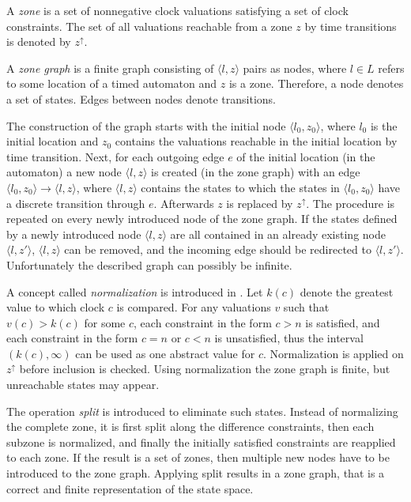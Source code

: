 A \emph{zone} is a set of nonnegative clock valuations satisfying a set of clock constraints.
The set of all valuations reachable from a zone $z$ by time transitions is denoted by $z^\uparrow$.

A \emph{zone graph} is a finite graph consisting of $\langle l,z \rangle$ pairs as nodes, where $l \in L$ refers to some
location of a timed automaton and $z$ is a zone. Therefore, a node denotes a set
of states. Edges between nodes denote transitions. 

The construction of the graph starts with the initial node  $\langle l_0,z_0 \rangle$,
where $l_0$ is the initial location and $z_0$ contains the valuations reachable in the initial location by time transition. 
Next, for each outgoing edge $e$ of the initial location (in the automaton) a new node  $\langle l,z \rangle$ is created (in the zone graph) with an edge
$\langle l_0,z_0 \rangle \to \langle l,z \rangle$, where $\langle l,z \rangle$ contains the states to which the states in $\langle l_0,z_0 \rangle$ have a discrete transition through $e$. Afterwards $z$ is replaced by $z^\uparrow$.  The procedure is repeated on every newly introduced node of the zone graph. If the states defined by a newly introduced node $\langle l,z \rangle$ are all contained in an already existing node $\langle l,z' \rangle$, $\langle l,z \rangle$ can be removed, and the incoming edge should be redirected to $\langle l,z' \rangle$.
Unfortunately the described graph can possibly be infinite. 

A concept called \emph{normalization} is introduced in .
Let $k(c)$ denote the greatest value to which clock $c$ is compared.
For any valuations $v$ such that $v(c)>k(c)$ for some $c$, each constraint in the form $c > n$ is satisfied, and each constraint in the form $c = n$ or $c < n$ is unsatisfied, thus the interval $(k(c),\infty)$ can be used as one abstract value for $c$.
Normalization is applied on $z^\uparrow$ 
before inclusion is checked.
Using normalization the zone 
graph is finite, but unreachable states may appear. 

The operation \emph{split}  is introduced to eliminate such states. Instead of
normalizing the complete zone, it is first split along the difference constraints,
then each subzone is normalized, and finally the initially satisfied constraints are reapplied to each zone. If the result is a set of zones, then multiple new nodes have to be introduced to the zone graph. Applying split results in a zone
graph, that is a correct and finite representation of the state space.

